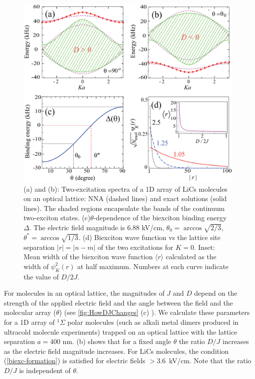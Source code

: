 \begin{figure}[htbp]
\centering
\includegraphics[width=\linewidth]{FigureBiexciton.pdf}
\caption{(a) and (b): Two-excitation spectra of a 1D array of LiCs molecules on an optical lattice: NNA
(dashed lines) and exact solutions (solid lines). The shaded regions encapsulate the bands of the continuum 
two-exciton states. (c)$\theta$-dependence of the biexciton binding energy $\Delta$. The electric field magnitude is
 6.88 kV/cm, $\theta_0 = \arccos \sqrt{2/3}$, $\theta^\ast = \arccos \sqrt{1/3}$. (d) Biexciton wave function vs the
 lattice site separation $|r|=|n-m|$ of the two excitations for $K=0$. Inset: Mean width of the biexciton wave function
 $\langle r \rangle$ calculated as the width of $\psi^{2}_{K}(r)$ at half maximum. Numbers at each curve indicate the
 value of $D/2J$.}
\label{fig:biexcitonSpectrum}
\end{figure}


For molecules in an optical lattice, the magnitudes of $J$ and $D$ depend on the strength of the applied electric field
 and the angle between the field and the molecular array  ($\theta$) (see \autoref{fig:HowDJChanges} (c) ).  We
 calculate these parameters for a 1D array of $^1\Sigma$ polar molecules (such as alkali metal dimers produced in
 ultracold molecule experiments) trapped on an optical lattice with the lattice separation $a = 400$ nm.
  (b)
 shows that for a fixed angle $\theta$ the ratio $D/J$ increases as the electric field magnitude increases. 
For LiCs molecules, the condition (\ref{biexc-formation}) is satisfied for electric fields $>3.6$~kV/cm. Note that the
 ratio $D/J$ is independent of $\theta$. 


